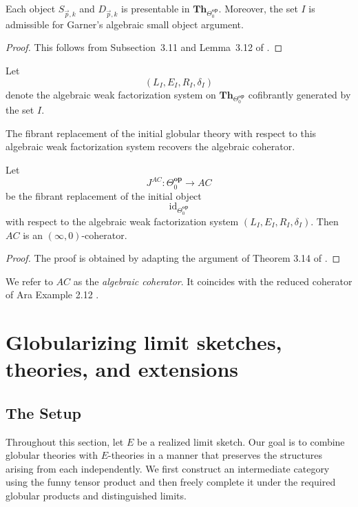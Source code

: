 \documentclass{tac}
\begin{document}
\begin{lemma}\label{admiss_1}
Each object $S_{\vec{p},k}$ and $D_{\vec{p},k}$ is presentable in
$\mathbf{Th}_{\Theta_0^\mathbf{op}}$.
Moreover, the set $I$ is admissible for Garner's algebraic small object argument.
\end{lemma}

\begin{proof}
This follows from Subsection~3.11 and Lemma~3.12 of \cite{Malt}.
\end{proof}

\begin{notation}
Let
\[
(L_I,E_I,R_I,\delta_I)
\]
denote the algebraic weak factorization system on
$\mathbf{Th}_{\Theta_0^\mathbf{op}}$
cofibrantly generated by the set $I$.
\end{notation}

The fibrant replacement of the initial globular theory with respect to this algebraic weak factorization system recovers the algebraic coherator.

\begin{lemma}
Let
\[
J^{AC}:\Theta_0^\mathbf{op}\longrightarrow AC
\]
be the fibrant replacement of the initial object
\[
\mathrm{id}_{\Theta_0^\mathbf{op}}
\]
with respect to the algebraic weak factorization system
$(L_I,E_I,R_I,\delta_I)$.
Then $AC$ is an $(\infty,0)$-coherator.
\end{lemma}

\begin{proof}
The proof is obtained by adapting the argument of Theorem 3.14 of \cite{Malt}.
\end{proof}

We refer to $AC$ as the \emph{algebraic coherator}. It coincides with the reduced coherator of Ara Example 2.12 \cite{Dim1}.

\section{Globularizing limit sketches, theories, and extensions} \label{glob_lim_sketch} 
\subsection*{The Setup}

Throughout this section, let $E$ be a realized limit sketch. Our goal is to combine globular theories with $E$-theories in a manner that preserves the structures arising from each independently. We first construct an intermediate category using the funny tensor product and then freely complete it under the required globular products and distinguished limits. 
\end{document}
